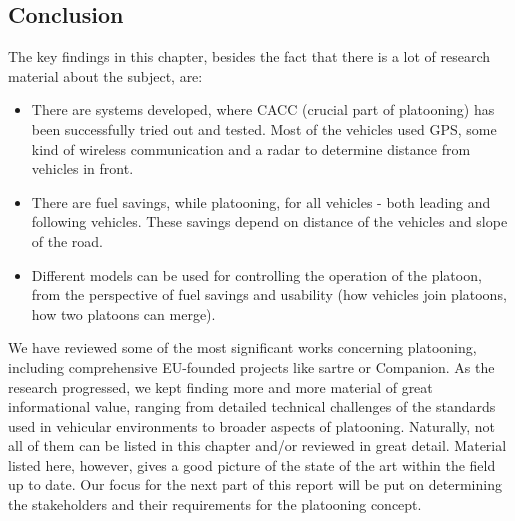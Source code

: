 \subsection{Conclusion}
The key findings in this chapter, besides the fact that there is a lot of research material about the subject, are:
\begin{itemize}[noitemsep]
    \item There are systems developed, where \acrlong{CACC} (crucial part of platooning) has been successfully tried out and tested. Most of the vehicles used \acrshort{GPS}, some kind of wireless communication and a radar to determine distance from vehicles in front.
    \item There are fuel savings, while platooning, for all vehicles - both leading and following vehicles. These savings depend on distance of the vehicles and slope of the road.
    \item Different models can be used for controlling the operation of the platoon, from the perspective of fuel savings and usability (how vehicles join platoons, how two platoons can merge).
\end{itemize}
% 
We have reviewed some of the most significant works concerning platooning, including comprehensive EU-founded projects like \acrshort{sartre} or Companion. As the research progressed, we kept finding more and more material of great informational value, ranging from detailed technical challenges of the standards used in vehicular environments to broader aspects of platooning. Naturally, not all of them can be listed in this chapter and/or reviewed in great detail. Material listed here, however, gives a good picture of the state of the art within the field up to date. Our focus for the next part of this report will be put on determining the stakeholders and their requirements for the platooning concept.\par
